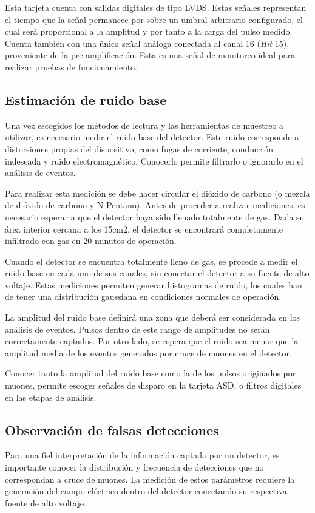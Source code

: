 		Esta tarjeta cuenta con salidas digitales de tipo LVDS. Estas señales representan el tiempo que la señal permanece por sobre un umbral arbitrario configurado, el cual será proporcional a la amplitud y por tanto a la carga del pulso medido. Cuenta también con una única señal análoga conectada al canal 16 (\textit{Hit} 15), proveniente de la pre-amplificación. Esta es una señal de monitoreo ideal para realizar pruebas de funcionamiento.
		

	\subsection{Estimación de ruido base}
		Una vez escogidos los métodos de lectura y las herramientas de muestreo a utilizar, es necesario medir el ruido base del detector. Este ruido corresponde a distorsiones propias del dispositivo, como fugas de corriente, conducción indeseada y ruido electromagnético. Conocerlo permite filtrarlo o ignorarlo en el análisis de eventos.
		
		Para realizar esta medición se debe hacer circular el dióxido de carbono (o mezcla de dióxido de carbono y N-Pentano). Antes de proceder a realizar mediciones, es necesario esperar a que el detector haya sido llenado totalmente de gas. Dada su área interior cercana a los 15cm2, el detector se encontrará completamente infiltrado con gas en 20 minutos de operación.
		
		Cuando el detector se encuentra totalmente lleno de gas, se procede a medir el ruido base en cada uno de sus canales, sin conectar el detector a su fuente de alto voltaje. Estas mediciones permiten generar histogramas de ruido, los cuales han de tener una distribución gaussiana en condiciones normales de operación.
		
		La amplitud del ruido base definirá una zona que deberá ser considerada en los análisis de eventos. Pulsos dentro de este rango de amplitudes no serán correctamente captados. Por otro lado, se espera que el ruido sea menor que la amplitud media de los eventos generados por cruce de muones en el detector.
		
		Conocer tanto la amplitud del ruido base como la de los pulsos originados por muones, permite escoger señales de disparo en la tarjeta ASD, o filtros digitales en las etapas de análisis. 
		
	\subsection{Observación de falsas detecciones}
		Para una fiel interpretación de la información captada por un detector, es importante conocer la distribución y frecuencia de detecciones que no correspondan a cruce de muones. La medición de estos parámetros requiere la generación del campo eléctrico dentro del detector conectando su respectiva fuente de alto voltaje.
		
